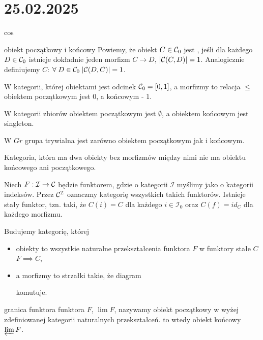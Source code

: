 \section{25.02.2025}{cos}

\begin{definition}{obiekt początkowy i końcowy}{}
  Powiemy, że obiekt $C\in \mathcal{C}_0$ jest , jeśli dla każdego $D\in\mathcal{C}_0$ istnieje dokładnie jeden morfizm $C\to D$, $|\mathcal{C}(C, D)|=1$. Analogicznie definiujemy  $C$: $\forall\;D\in\mathcal{C}_0\;|\mathcal{C}(D, C)|=1$.
\end{definition}

\begin{example}[m]
  \item W kategorii, której obiektami jest odcinek $\mathcal{C}_0=[0,1]$, a morfizmy to relacja $\leq$ obiektem początkowym jest $0$, a końcowym - $1$.
  \item W kategorii zbiorów obiektem początkowym jest $\emptyset$, a obiektem końcowym jest singleton.
  \item W $Gr$ grupa trywialna jest zarówno obiektem początkowym jak i końcowym.
  \item Kategoria, która ma dwa obiekty bez morfizmów między nimi nie ma obiektu końcowego ani początkowego.
\end{example}

Niech $F:\mathcal{I}\to \mathcal{C}$ będzie funktorem, gdzie o kategorii $\mathcal{I}$ myślimy jako o kategorii indeksów. Przez $\mathcal{C}^{\mathcal{I}}$ oznaczmy kategorię wszystkich takich funktorów. 
Istnieje stały funktor, tzn. taki, że $C(i)=C$ dla każdego $i\in\mathcal{I}_0$ oraz $C(f)=id_C$ dla każdego morfizmu.

Budujemy kategorię, której 
\begin{itemize}
  \item obiekty to wszystkie naturalne przekształcenia funktora $F$ w funktory stałe $C$ $F\implies C$, 
  \item a morfizmy to strzałki takie, że diagram
    \begin{center}
    \end{center}
    komutuje.
\end{itemize}

\begin{definition}{granica funktora}{}
   funktora $F$, $\lim F$, nazywamy obiekt początkowy w wyżej zdefiniowanej kategorii naturalnych przekształceń.  to wtedy obiekt końcowy $\varprojlim F$.
\end{definition}

